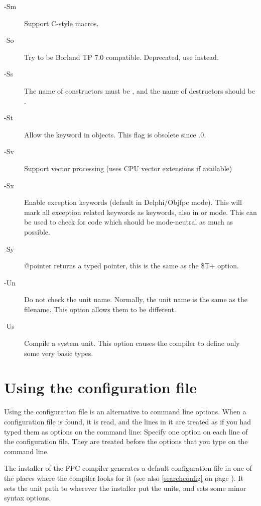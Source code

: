 \begin{description}
\item [-Sm]  Support C-style macros.
\item [-So]  Try to be Borland TP 7.0 compatible. Deprecated, use
 instead.
\item [-Ss]  The name of constructors must be , and the
name of destructors should be .
\item [-St]  Allow the  keyword in objects. This
flag is obsolete since .0.
\item[-Sv] Support vector processing (uses CPU vector extensions if available)
\item [-Sx] Enable exception keywords (default in Delphi/Objfpc mode). This
will mark all exception related keywords as keywords, also in \tp or
 mode. This can be used to check for code which should be
mode-neutral as much as possible.
\item [-Sy]  @pointer returns a typed pointer, this is the same as the \$T+ option.

\item [-Un]  Do not check the unit name. Normally, the unit name
is the same as the filename. This option allows them to be different.
\item [-Us]  Compile a system unit. This option causes the
compiler to define only some very basic types.
\end{description}


\section{Using the configuration file}
\label{se:configfile}
Using the configuration file  is an alternative to command
line options. When a configuration file is found, it is read, and the lines
in it are treated as if you had typed them as options on the command line:
Specify one option on each line of the configuration file. They are treated
before the options that you type on the command line.

The installer of the FPC compiler generates a default configuration file
in one of the places where the compiler looks for it (see also
 \ref{searchconfig} on page \pageref{searchconfig}). 
It sets the unit path to wherever the installer  put the units, and sets some minor syntax options. 

